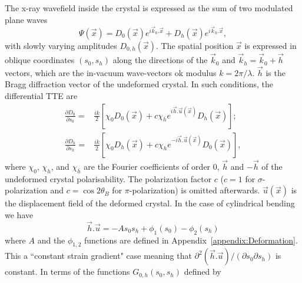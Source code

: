 \documentclass[preprint]{iucr}              %
\newcommand{\inred}[1]{{\color{red}#1}}
\begin{document}
The x-ray wavefield inside the crystal is expressed as the sum of two modulated plane waves
\begin{equation}
    \Psi(\vec x) = D_0(\vec x) e^{i \vec k_0 . \vec x} + D_h(\vec x) e^{i \vec k_h . \vec x},
\end{equation}
with slowly varying amplitudes $D_{0,h}(\vec x)$.
The spatial position $\vec x$ is expressed in oblique coordinates $(s_0,s_h)$ along the directions of the $\vec k_0$ and $\vec k_h=\vec k_0 + \vec h$ vectors\inred{, which are the in-vacuum wave-vectors ok modulus $k=2\pi/\lambda$. $\vec{h}$ is the Bragg diffraction vector of the undeformed crystal. In such conditions,} the differential TTE are
\begin{subequations}
\label{eq:TT}
\begin{align}
\frac{\partial D_0}{\partial s_0} =& \frac{ik}{2} \left[ \chi_0 D_0(\vec x)+c \chi_{\bar h} e^{i \vec h . \vec u (\vec x)} D_h(\vec x) \right]; \\
\frac{\partial D_h}{\partial s_h} =& \frac{ik}{2} \left[ \chi_0 D_h(\vec x)+c \chi_{h} e^{-i \vec h . \vec u (\vec x)} D_0(\vec x) \right],
\end{align}
\end{subequations}
where $\chi_0$, $\chi_h$, and $\chi_{\bar h}$ are the Fourier coefficients of order 0, $\vec h$ and $-\vec h$ of the undeformed crystal polarisability. The polarization factor $c$ ($c=1$ for $\sigma$-polarization and $c=\cos2\theta_B$  for $\pi$-polarization) \inred{is} omitted afterwards. 
$\vec u (\vec x)$ is the displacement field of the deformed crystal.
In the case of \inred{cylindrical bending we have}
\begin{equation}
\label{eq:cylinder}
    \vec h . \vec u = -A s_0 s_h + \phi_1(s_0) - \phi_2(s_h)
\end{equation}
where $A$ and the $\phi_{1,2}$ functions are \inred{defined} in Appendix~\ref{appendix:Deformation}.
This a 
``constant strain gradient" \inred{case} \cite{authierbook} meaning that $\partial^2(\vec h . \vec u)/(\partial s_0 \partial s_h)$ is constant. \inred{In terms of} the functions $G_{0,h}(s_0,s_h)$ defined by
\end{document}
